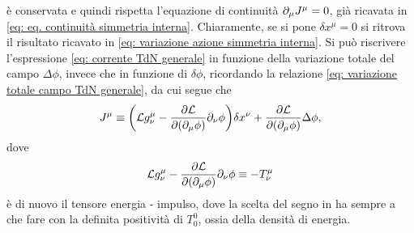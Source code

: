 è conservata e quindi rispetta l'equazione di continuità $\partial_\mu J^\mu = 0$, già ricavata in \eqref{eq: eq. continuità simmetria interna}. Chiaramente, se si pone $\delta x^\mu = 0$ si ritrova il risultato ricavato in \eqref{eq: variazione azione simmetria interna}. Si può riscrivere l'espressione \eqref{eq: corrente TdN generale} in funzione della variazione totale del campo $\Delta\phi$, invece che in funzione di $\delta\phi$, ricordando la relazione \eqref{eq: variazione totale campo TdN generale}, da cui segue che
\begin{equation}
    J^\mu \equiv \bigg(\mathcal{L} g^\mu_\nu - \frac{\partial\mathcal{L}}{\partial(\partial_\mu\phi)}\partial_\nu\phi\bigg)\delta x^\nu + \frac{\partial\mathcal{L}}{\partial(\partial_\mu\phi)}\Delta\phi,
\end{equation}
dove 
\begin{equation}
    \mathcal{L} g^\mu_\nu - \frac{\partial\mathcal{L}}{\partial(\partial_\mu\phi)}\partial_\nu\phi \equiv -T^\mu_\nu
\end{equation}
è di nuovo il tensore energia - impulso, dove la scelta del segno in ha sempre a che fare con la definita positività di $T_0^0$, ossia della densità di energia. 

